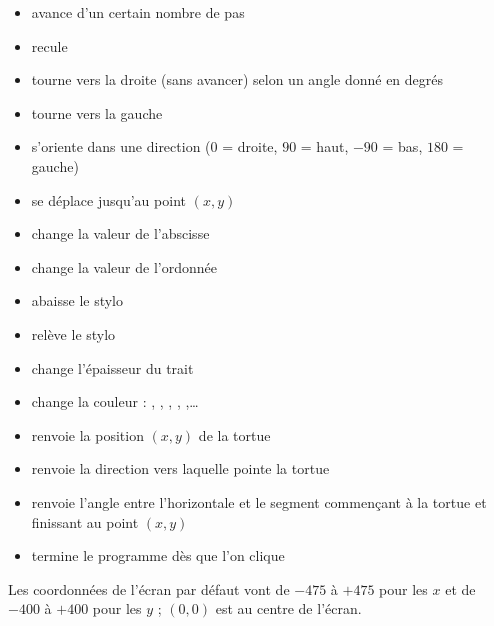 \documentclass[12pt,class=report,crop=false]{standalone}
\begin{document}



\centerline{}

\bigskip
\bigskip

\begin{itemize}
  \item {} avance d'un certain nombre de pas
  \item {} recule
  \item {} tourne vers la droite (sans avancer) selon un angle donné en degrés
  \item {} tourne vers la gauche
  \item {} s'oriente dans une direction ($0$ = droite, $90$ = haut, $-90$ = bas, $180$ = gauche)
  \item {} se déplace jusqu'au point $(x,y)$
  \item {} change la valeur de l'abscisse
  \item {} change la valeur de l'ordonnée
  
  
  \item {} abaisse le stylo
  \item {} relève le stylo
  \item {} change l'épaisseur du trait
  \item {} change la couleur : , , , , ,\ldots
  
  \item {}  renvoie la position $(x,y)$ de la tortue
  \item {} renvoie la direction  vers laquelle pointe la tortue
  \item {} renvoie l'angle entre l'horizontale et le segment commençant à la tortue et finissant au point $(x,y)$
  \item {} termine le programme dès que l'on clique
\end{itemize}

\newpage


Les coordonnées de l'écran par défaut vont de $-475$ à $+475$ pour les $x$ et
de $-400$ à $+400$ pour les $y$ ; $(0,0)$ est au centre de l'écran.

\end{document}
